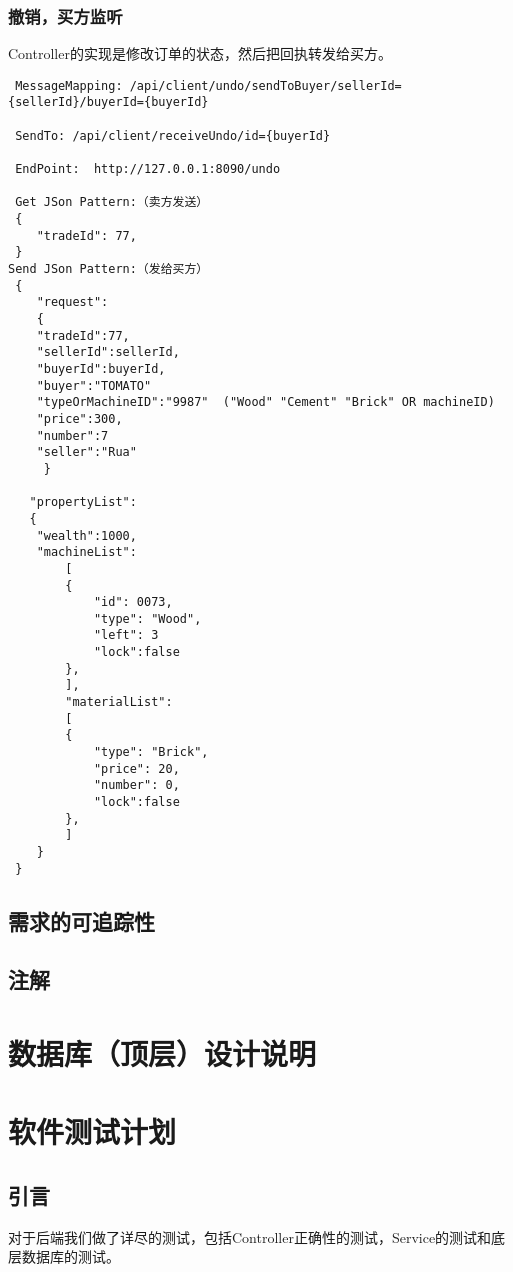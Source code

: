 \documentclass{article}
\begin{document}
				\subsubsection{撤销，买方监听}

                Controller的实现是修改订单的状态，然后把回执转发给买方。
                
\begin{lstlisting}
 MessageMapping: /api/client/undo/sendToBuyer/sellerId={sellerId}/buyerId={buyerId}

 SendTo: /api/client/receiveUndo/id={buyerId}

 EndPoint:  http://127.0.0.1:8090/undo

 Get JSon Pattern:（卖方发送）
 {
    "tradeId": 77,
 }
Send JSon Pattern:（发给买方）
 {
    "request":
    {
    "tradeId":77,
    "sellerId":sellerId,
    "buyerId":buyerId,
    "buyer":"TOMATO"
    "typeOrMachineID":"9987"  ("Wood" "Cement" "Brick" OR machineID)
    "price":300,
    "number":7
    "seller":"Rua"
     }

   "propertyList":
   {
   	"wealth":1000,
   	"machineList":
    	[
        {
            "id": 0073,
            "type": "Wood",
            "left": 3
            "lock":false
        },
    	],
    	"materialList":
    	[
        {
            "type": "Brick",
            "price": 20,
            "number": 0,
            "lock":false
        },
    	]
    }
 }

\end{lstlisting}

		\subsection{需求的可追踪性}

		\subsection{注解}
		
\section{数据库（顶层）设计说明}
\label{数据库（顶层）设计说明}


	\section{软件测试计划}
		\label{软件测试计划}
		\subsection{引言}
			对于后端我们做了详尽的测试，包括Controller正确性的测试，Service的测试和底层数据库的测试。
\end{document}
